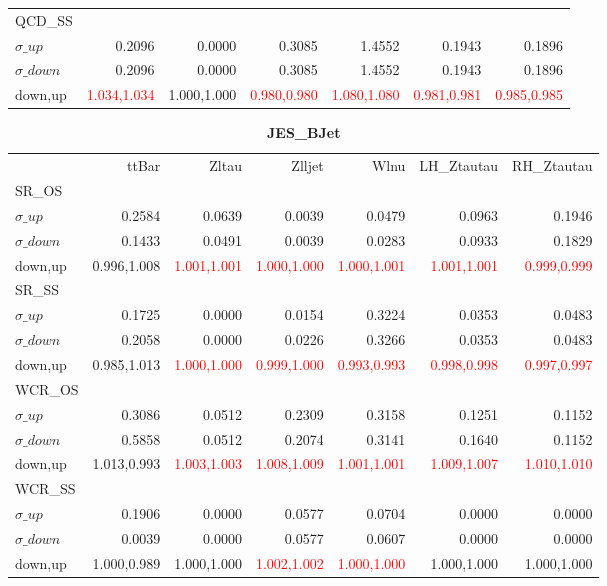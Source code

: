 \documentclass[11pt,oneside,a4paper]{article}
\begin{document}
\begin{table}
\begin{tabular}{lrrrrrr}
\hline
QCD\_SS &  &  &  &  &  &  \\
$\sigma\_up$ & 0.2096 & 0.0000 & 0.3085 & 1.4552 & 0.1943 & 0.1896 \\
$\sigma\_down$ & 0.2096 & 0.0000 & 0.3085 & 1.4552 & 0.1943 & 0.1896 \\
down,up & \textcolor{red}{1.034,1.034} & 1.000,1.000 & \textcolor{red}{0.980,0.980} & \textcolor{red}{1.080,1.080} & \textcolor{red}{0.981,0.981} & \textcolor{red}{0.985,0.985} \\

\hline
\end{tabular}
\end{table}
\begin{table}
\centering
\caption{\bf{JES\_BJet}}
\begin{tabular}{lrrrrrr}
 & ttBar & Zltau & Zlljet & Wlnu & LH\_Ztautau & RH\_Ztautau \\
SR\_OS &  &  &  &  &  &  \\
$\sigma\_up$ & 0.2584 & 0.0639 & 0.0039 & 0.0479 & 0.0963 & 0.1946 \\
$\sigma\_down$ & 0.1433 & 0.0491 & 0.0039 & 0.0283 & 0.0933 & 0.1829 \\
down,up & 0.996,1.008 & \textcolor{red}{1.001,1.001} & \textcolor{red}{1.000,1.000} & \textcolor{red}{1.000,1.001} & \textcolor{red}{1.001,1.001} & \textcolor{red}{0.999,0.999} \\

\hline
SR\_SS &  &  &  &  &  &  \\
$\sigma\_up$ & 0.1725 & 0.0000 & 0.0154 & 0.3224 & 0.0353 & 0.0483 \\
$\sigma\_down$ & 0.2058 & 0.0000 & 0.0226 & 0.3266 & 0.0353 & 0.0483 \\
down,up & 0.985,1.013 & \textcolor{red}{1.000,1.000} & \textcolor{red}{0.999,1.000} & \textcolor{red}{0.993,0.993} & \textcolor{red}{0.998,0.998} & \textcolor{red}{0.997,0.997} \\

\hline
WCR\_OS &  &  &  &  &  &  \\
$\sigma\_up$ & 0.3086 & 0.0512 & 0.2309 & 0.3158 & 0.1251 & 0.1152 \\
$\sigma\_down$ & 0.5858 & 0.0512 & 0.2074 & 0.3141 & 0.1640 & 0.1152 \\
down,up & 1.013,0.993 & \textcolor{red}{1.003,1.003} & \textcolor{red}{1.008,1.009} & \textcolor{red}{1.001,1.001} & \textcolor{red}{1.009,1.007} & \textcolor{red}{1.010,1.010} \\

\hline
WCR\_SS &  &  &  &  &  &  \\
$\sigma\_up$ & 0.1906 & 0.0000 & 0.0577 & 0.0704 & 0.0000 & 0.0000 \\
$\sigma\_down$ & 0.0039 & 0.0000 & 0.0577 & 0.0607 & 0.0000 & 0.0000 \\
down,up & 1.000,0.989 & 1.000,1.000 & \textcolor{red}{1.002,1.002} & \textcolor{red}{1.000,1.000} & 1.000,1.000 & 1.000,1.000 \\


\end{tabular}
\end{table}
\end{document}
